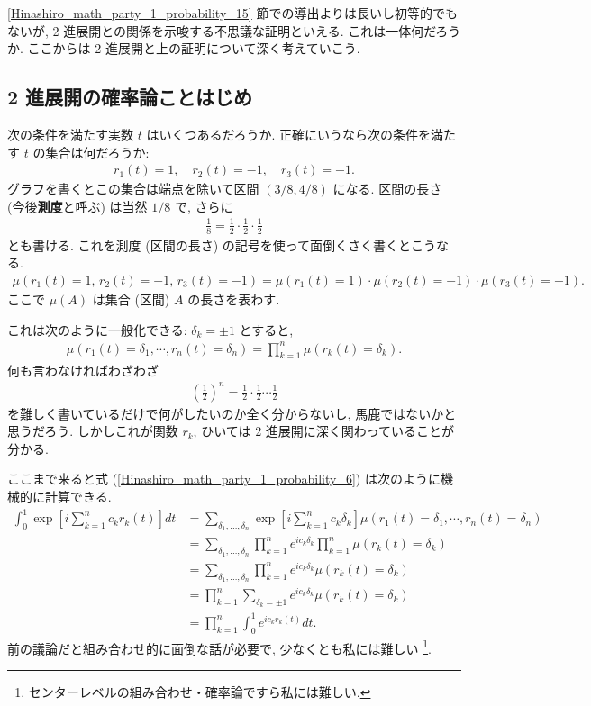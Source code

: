 \documentclass[openany, a4paper, oneside]{book}
\theoremstyle{break}
\theoremstyle{breakdefn}
\newcommand{\rbk}[1]{\left (#1\right)}
\newcommand{\sqbk}[1]{\left[#1\right]}
\begin{document}
\ref{Hinashiro_math_party_1_probability_15} 節での導出よりは長いし初等的でもないが, 2 進展開との関係を示唆する不思議な証明といえる.
これは一体何だろうか.
ここからは 2 進展開と上の証明について深く考えていこう.
\subsection{2 進展開の確率論ことはじめ \label{Hinashiro_math_party_1_probability_14}}
\label{sec-8-1-4-4}

次の条件を満たす実数 $t$ はいくつあるだろうか.
正確にいうなら次の条件を満たす $t$ の集合は何だろうか:
\begin{align}
 r_1 (t) = 1,
 \quad r_2 (t) = -1,
 \quad r_3 (t) = -1.
\end{align}
グラフを書くとこの集合は端点を除いて区間 $\rbk{3/8, 4/8}$ になる.
区間の長さ (今後\textbf{測度}と呼ぶ) は当然 $1/8$ で, さらに
\begin{align}
 \frac{1}{8}
 =
 \frac{1}{2} \cdot \frac{1}{2} \cdot \frac{1}{2}
\end{align}
とも書ける.
これを測度 (区間の長さ) の記号を使って面倒くさく書くとこうなる.
\begin{align}
 \mu \rbk{r_1 (t) = 1, \, r_2 (t) = -1, \, r_3 (t) = -1}
 =
 \mu \rbk{r_1 (t)=1} \cdot \mu \rbk{r_2 (t)=-1} \cdot \mu \rbk{r_3 (t)=-1}.
\end{align}
ここで $\mu (A)$ は集合 (区間) $A$ の長さを表わす.

これは次のように一般化できる: $\delta_k = \pm 1$ とすると,
\begin{align}
 \mu \rbk{r_1 (t) = \delta_1, \cdots, r_n (t) = \delta_n}
 =
 \prod_{k=1}^{n} \mu \rbk{r_k (t)=\delta_k}. \label{Hinashiro_math_party_1_probability_7}
\end{align}
何も言わなければわざわざ
\begin{align}
 \rbk{\frac{1}{2}}^n
 =
 \frac{1}{2} \cdot \frac{1}{2} \cdots \frac{1}{2}
\end{align}
を難しく書いているだけで何がしたいのか全く分からないし, 馬鹿ではないかと思うだろう.
しかしこれが関数 $r_k$, ひいては 2 進展開に深く関わっていることが分かる.

ここまで来ると式 (\ref{Hinashiro_math_party_1_probability_6}) は次のように機械的に計算できる.
\begin{align}
 \int_0^1 \exp \sqbk{i \sum_{k=1}^n c_k r_k (t)} dt
 &=
 \sum_{\delta_1,\dots,\delta_n} \exp \sqbk{i \sum_{k=1}^{n} c_k \delta_k} \mu \rbk{r_1 (t) = \delta_1, \cdots, r_n (t) = \delta_n} \\
 &=
 \sum_{\delta_1,\dots,\delta_n} \prod_{k=1}^n e^{i c_k \delta_k} \prod_{k=1}^n \mu \rbk{r_k (t) = \delta_k} \\
 &=
 \sum_{\delta_1,\dots,\delta_n} \prod_{k=1}^n e^{i c_k \delta_k} \mu \rbk{r_k (t) = \delta_k} \\
 &=
 \prod_{k=1}^n \sum_{\delta_k = \pm 1} e^{i c_k \delta_k} \mu \rbk{r_k (t) = \delta_k} \\
 &=
 \prod_{k=1}^n \int_0^1 e^{i c_k r_k (t)} dt.
\end{align}
前の議論だと組み合わせ的に面倒な話が必要で, 少なくとも私には難しい \footnote{センターレベルの組み合わせ・確率論ですら私には難しい.
 }.
\end{document}
